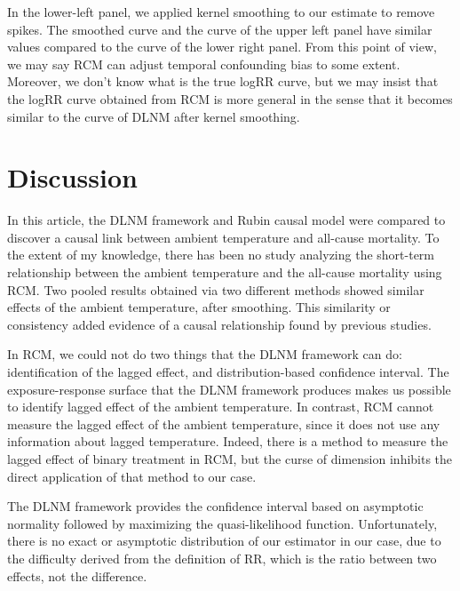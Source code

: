 \documentclass[12pt]{article}
\begin{document}
In the lower-left panel, we applied kernel smoothing to our estimate to remove spikes.
The smoothed curve and the curve of the upper left panel have similar values 
compared to the curve of the lower right panel.
From this point of view, 
we may say RCM can adjust temporal confounding bias to some extent.
Moreover, we don't know what is the true logRR curve,
but we may insist that the logRR curve obtained from RCM is more general
in the sense that it becomes similar to the curve of DLNM after kernel smoothing.


\section{Discussion}
\label{section:discussion}

In this article,
the DLNM framework and Rubin causal model were compared
to discover a causal link between ambient temperature and all-cause mortality.
To the extent of my knowledge, there has been no study analyzing the short-term relationship 
between the ambient temperature and the all-cause mortality using RCM.
Two pooled results obtained via two different methods
showed similar effects of the ambient temperature, after smoothing.
This similarity or consistency
added evidence of a causal relationship found by previous studies.

In RCM, we could not do two things that the DLNM framework can do:
identification of the lagged effect, 
and distribution-based confidence interval.
The exposure-response surface that the DLNM framework produces 
makes us possible to identify lagged effect of the ambient temperature.
In contrast, RCM cannot measure the lagged effect of the ambient temperature,
since it does not use any information about lagged temperature.
Indeed, there is a method to measure the lagged effect of binary treatment in RCM\cite{bojinov2019},
but the curse of dimension inhibits the direct application of that method to our case.

The DLNM framework provides the confidence interval based on asymptotic normality 
followed by maximizing the quasi-likelihood function.
Unfortunately, there is no exact or asymptotic distribution of our estimator in our case,
due to the difficulty derived from the definition of RR, 
which is the ratio between two effects, not the difference.
\end{document}
